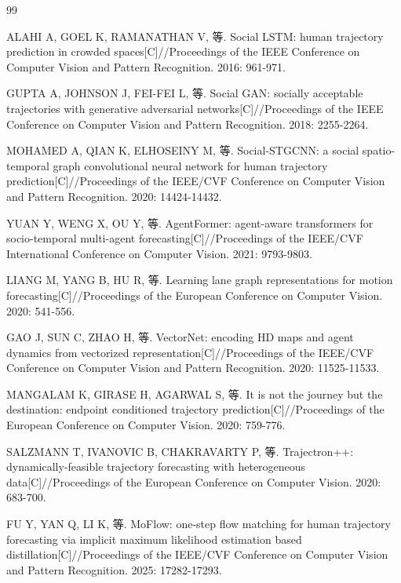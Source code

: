 \begin{thebibliography}{99}
\footnotesize

ALAHI A, GOEL K, RAMANATHAN V, 等. Social LSTM: human trajectory prediction in crowded spaces[C]//Proceedings of the IEEE Conference on Computer Vision and Pattern Recognition. 2016: 961-971.

GUPTA A, JOHNSON J, FEI-FEI L, 等. Social GAN: socially acceptable trajectories with generative adversarial networks[C]//Proceedings of the IEEE Conference on Computer Vision and Pattern Recognition. 2018: 2255-2264.

MOHAMED A, QIAN K, ELHOSEINY M, 等. Social-STGCNN: a social spatio-temporal graph convolutional neural network for human trajectory prediction[C]//Proceedings of the IEEE/CVF Conference on Computer Vision and Pattern Recognition. 2020: 14424-14432.

YUAN Y, WENG X, OU Y, 等. AgentFormer: agent-aware transformers for socio-temporal multi-agent forecasting[C]//Proceedings of the IEEE/CVF International Conference on Computer Vision. 2021: 9793-9803.

LIANG M, YANG B, HU R, 等. Learning lane graph representations for motion forecasting[C]//Proceedings of the European Conference on Computer Vision. 2020: 541-556.

GAO J, SUN C, ZHAO H, 等. VectorNet: encoding HD maps and agent dynamics from vectorized representation[C]//Proceedings of the IEEE/CVF Conference on Computer Vision and Pattern Recognition. 2020: 11525-11533.

MANGALAM K, GIRASE H, AGARWAL S, 等. It is not the journey but the destination: endpoint conditioned trajectory prediction[C]//Proceedings of the European Conference on Computer Vision. 2020: 759-776.

SALZMANN T, IVANOVIC B, CHAKRAVARTY P, 等. Trajectron++: dynamically-feasible trajectory forecasting with heterogeneous data[C]//Proceedings of the European Conference on Computer Vision. 2020: 683-700.

FU Y, YAN Q, LI K, 等. MoFlow: one-step flow matching for human trajectory forecasting via implicit maximum likelihood estimation based distillation[C]//Proceedings of the IEEE/CVF Conference on Computer Vision and Pattern Recognition. 2025: 17282-17293.


\end{thebibliography}
